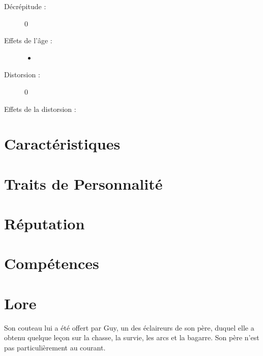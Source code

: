 \begin{multicols}{2}
\begin{description}
\item[Décrépitude :] 0
\item[Effets de l'âge :]\hspace{0pt}
\begin{itemize}
\item
\end{itemize}
\columnbreak
\item[Distorsion :] 0
\item[Effets de la distorsion :]\hspace{0pt}
\magusscarslong
\end{description}
\end{multicols}
\section*{Caractéristiques}


\caractableMP

\begin{multicols}{2}

\longVFQs

\section*{Traits de Personnalité}

\traitslong

\section*{Réputation}

\reputationslong



\section*{Compétences}

\abilitieslong

\end{multicols}


\section*{Lore}
Son couteau lui a été offert par Guy, un des éclaireurs de son père, duquel elle a obtenu quelque leçon sur la chasse, la survie, les arcs et la bagarre. Son père n'est pas particulièrement au courant.

